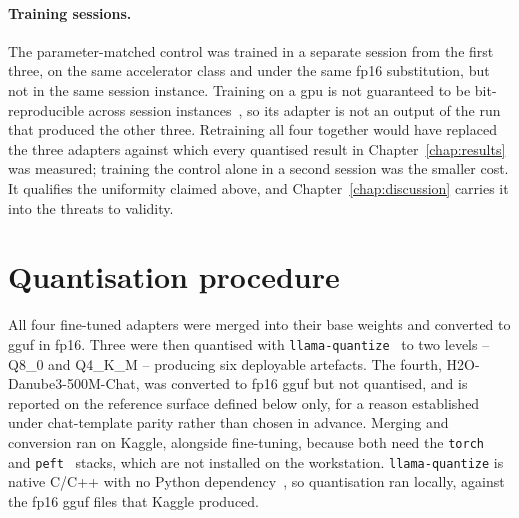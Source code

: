 \paragraph{Training sessions.}  The parameter-matched control was trained in a separate session from
the first three, on the same accelerator class and under the same fp16 substitution, but not in the
same session instance. Training on a \gls{gpu} is not guaranteed to be bit-reproducible across
session instances~\cite{pytorchrepro}, so its adapter is not an output of the run that produced the
other three. Retraining all four together would have replaced the three adapters against which every
quantised result in Chapter~\ref{chap:results} was measured; training the control alone in a second
session was the smaller cost. It qualifies the uniformity claimed above, and Chapter~\ref{chap:discussion} carries it
into the threats to validity.

\section{Quantisation procedure}
\label{sec:quantisation-procedure}
All four fine-tuned adapters were merged into their base weights and converted to \gls{gguf} in
fp16. Three were then quantised with \texttt{llama-quantize}~\cite{llamacpp} to two levels -- Q8\_0
and Q4\_K\_M -- producing six deployable artefacts. The fourth, H2O-Danube3-500M-Chat, was
converted to fp16 \gls{gguf} but not quantised, and is reported on the reference surface defined
below only, for a reason established under chat-template parity rather than chosen in advance. Merging and conversion ran on Kaggle, alongside fine-tuning, because
both need the \texttt{torch}~\cite{pytorch} and \texttt{peft}~\cite{peft} stacks, which are not
installed on the workstation. \texttt{llama-quantize} is native C/C++ with no Python
dependency~\cite{llamacpp}, so quantisation ran locally, against the fp16 \gls{gguf} files that
Kaggle produced.

